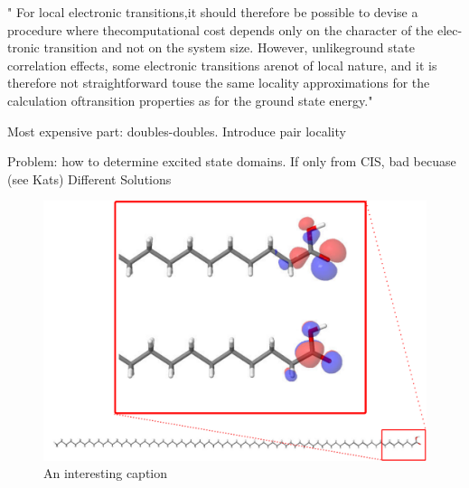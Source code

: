 " For local electronic transitions,it should therefore be possible to devise a procedure where thecomputational cost depends only on the character of the elec-tronic transition and not on the system size. However, unlikeground state correlation effects, some electronic transitions arenot of local nature, and it is therefore not straightforward touse  the  same  locality  approximations  for  the  calculation  oftransition properties as for the ground state energy."

Most expensive part: doubles-doubles. Introduce pair locality

Problem: how to determine excited state domains. If only from CIS, bad becuase (see Kats) Different Solutions

\begin{figure}
\centering
\includegraphics[scale=0.6]{Pics/NTOACID}
\caption{An interesting caption}
\end{figure}


